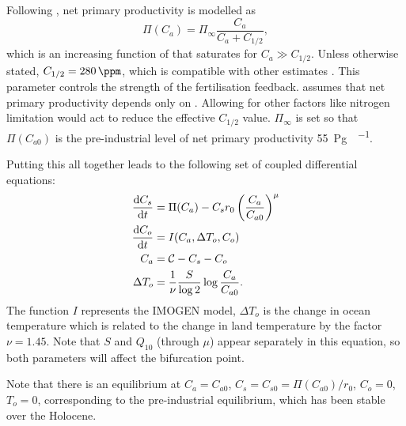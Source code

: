 Following \cite{Cox2006}, net primary productivity is modelled as
\begin{equation}
  \label{eq:npp}
  \Pi(C_a) = \Pi_{\infty}\frac{C_a}{C_a + C_{1/2}},
\end{equation}
which is an increasing function of  that saturates for $C_a \gg C_{1/2}$. Unless otherwise stated, $C_{1/2} = \SI{280}{\ppm}$, which is compatible with other estimates
\parencite{KolbySmith2016,Wenzel2016}. This parameter controls the strength of the  fertilisation feedback.  assumes that net primary productivity depends only
on . Allowing for other factors like nitrogen limitation would act to reduce the effective $C_{1/2}$ value. $\Pi_{\infty}$ is set so that $\Pi(C_{a0})$ is the pre-industrial
level of net primary productivity \SI{55}{\peta\gram\carbon\per\year}.

Putting this all together leads to the following set of coupled differential equations:
\begin{subequations}
  \label{eq:imogen_deterministic}
  \begin{align}
    \dv{C_s}{t}     &= \Pi(C_a) - C_s r_0 \left(\frac{C_a}{C_{a0}}\right)^\mu \\
    \dv{C_o}{t}     &= I(C_a,\Delta T_o,C_o) \\
    C_a             &= \mathcal{C} - C_s - C_o \\
    \Delta T_o             &= \frac{1}{\nu}\frac{S}{\log 2}\log \frac{C_a}{C_{a0}}.
  \end{align}
\end{subequations}
The function $I$ represents the IMOGEN model, $\Delta T_o$ is the change in ocean temperature which is related to the change in land temperature by the
factor $\nu = 1.45$. Note that $S$ and $Q_{10}$ (through $\mu$) appear separately in this equation, so both parameters will affect the bifurcation point.

Note that there is an equilibrium at $C_a = C_{a0}$, $C_s = C_{s0} = \Pi(C_{a0})/r_0$, $C_o = 0$, $T_o = 0$, corresponding to the pre-industrial equilibrium, which has been stable over the
Holocene.

